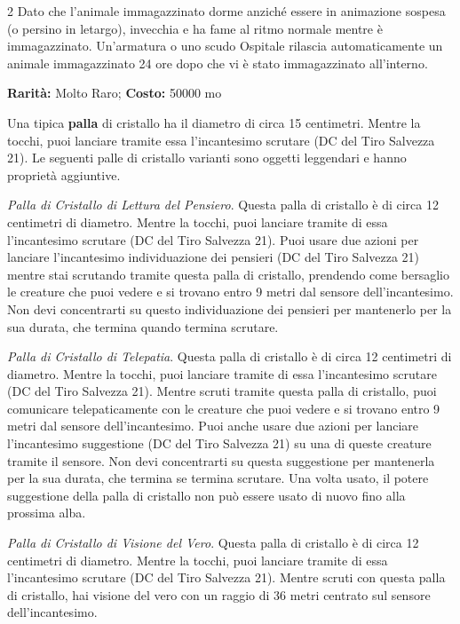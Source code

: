 \begin{multicols}{2}
Dato che l'animale immagazzinato dorme anziché essere in animazione sospesa (o persino in letargo), invecchia e ha fame al ritmo normale mentre è immagazzinato. Un'armatura o uno scudo Ospitale rilascia automaticamente un animale immagazzinato 24 ore dopo che vi è stato immagazzinato all'interno.


\textbf{Rarità:} Molto Raro; \textbf{Costo:} 50000 mo

Una tipica \textbf{palla} di cristallo ha il diametro di circa 15 centimetri. Mentre la tocchi, puoi lanciare tramite essa l'incantesimo scrutare (DC del Tiro Salvezza 21). Le seguenti palle di cristallo varianti sono oggetti leggendari e hanno proprietà aggiuntive.

\emph{Palla di Cristallo di Lettura del Pensiero}. Questa palla di cristallo è di circa 12 centimetri di diametro. Mentre la tocchi, puoi lanciare tramite di essa l'incantesimo scrutare (DC del Tiro Salvezza 21). Puoi usare due azioni per lanciare l'incantesimo individuazione dei pensieri (DC del Tiro Salvezza 21) mentre stai scrutando tramite questa palla di cristallo, prendendo come bersaglio le creature che puoi vedere e si trovano entro 9 metri dal sensore dell'incantesimo. Non devi concentrarti su questo individuazione dei pensieri per mantenerlo per la sua durata, che termina quando termina scrutare.

\emph{Palla di Cristallo di Telepatia}. Questa palla di cristallo è di circa 12 centimetri di diametro. Mentre la tocchi, puoi lanciare tramite di essa l'incantesimo scrutare (DC del Tiro Salvezza 21). Mentre scruti tramite questa palla di cristallo, puoi comunicare telepaticamente con le creature che puoi vedere e si trovano entro 9 metri dal sensore dell'incantesimo. Puoi anche usare due azioni per lanciare l'incantesimo suggestione (DC del Tiro Salvezza 21) su una di queste creature tramite il sensore. Non devi concentrarti su questa suggestione per mantenerla per la sua durata, che termina se termina scrutare. Una volta usato, il potere suggestione della palla di cristallo non può essere usato di nuovo fino alla prossima alba.

\emph{Palla di Cristallo di Visione del Vero}. Questa palla di cristallo è di circa 12 centimetri di diametro. Mentre la tocchi, puoi lanciare tramite di essa l'incantesimo scrutare (DC del Tiro Salvezza 21). Mentre scruti con questa palla di cristallo, hai visione del vero con un raggio di 36 metri centrato sul sensore dell'incantesimo.


\end{multicols}
